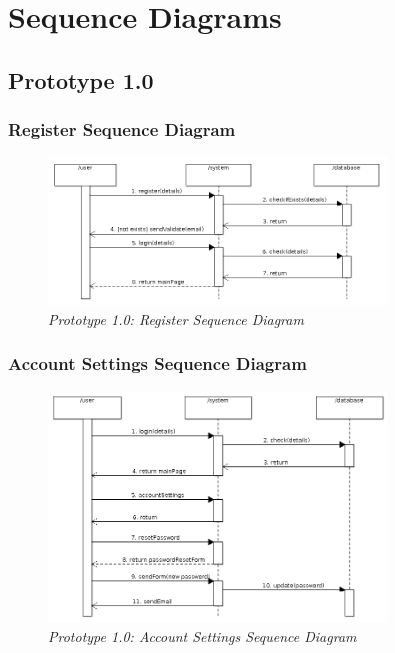 \documentclass[12pt,twoside,a4paper]{report}
\begin{document}
\section{Sequence Diagrams}\label{3.6}

\subsection{Prototype 1.0}\label{3.6.1}

\subsubsection{Register Sequence Diagram}\label{3.6.1.1}
\begin{figure}[!ht]
	\centering
		\includegraphics[width=0.8\textwidth, totalheight=5.5cm]{register_sequence_diagram}
	\caption{\textit{Prototype 1.0: Register Sequence Diagram}}
	\label{f3.6.1.1}
\end{figure}

\subsubsection{Account Settings Sequence Diagram}\label{3.6.1.2}
\begin{figure}[!ht]
	\centering
		\includegraphics[width=0.8\textwidth, totalheight=6cm]{account_settings_sequence_diagram}
	\caption{\textit{Prototype 1.0: Account Settings Sequence Diagram}}
	\label{f3.6.1.2}
\end{figure}
\end{document}
